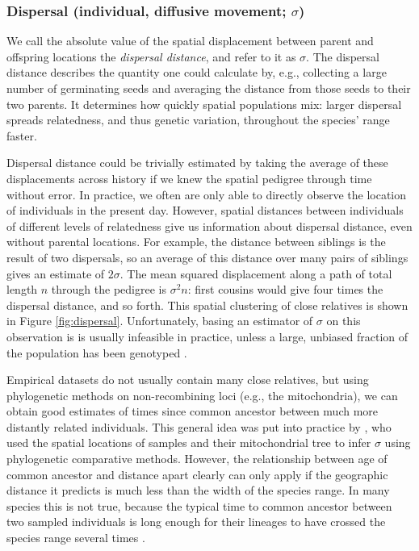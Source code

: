 \documentclass{ar-1col}
\renewcommand{\emph}[1]{{\textit{#1}}}
\begin{document}
\subsubsection{Dispersal (individual, diffusive movement; $\sigma$)}

We call the absolute value of the spatial displacement between parent and offspring locations
the \emph{dispersal distance}, and refer to it as $\sigma$.
The dispersal distance describes the quantity one could calculate by,
e.g., collecting a large number of germinating seeds
and averaging the distance from those seeds to their two parents.
It determines how quickly spatial populations mix:
larger dispersal spreads relatedness, and thus genetic variation,
throughout the species' range faster.

Dispersal distance could be trivially estimated by taking
the average of these displacements across history
if we knew the spatial pedigree through time without error.
In practice, we often are only able to directly observe
the location of individuals in the present day.
However, 
spatial distances between individuals of different levels of relatedness
give us information about dispersal distance, even without parental locations.
For example,
the distance between siblings is the result of two dispersals,
so an average of this distance over many pairs of siblings 
gives an estimate of $2 \sigma$.
The mean squared displacement along
a path of total length $n$ through the pedigree is $\sigma^2 n$:
first cousins would give four times the dispersal distance, and so forth.
This spatial clustering of close relatives
is shown in Figure \ref{fig:dispersal}.
Unfortunately, basing an estimator of $\sigma$ on this observation
is is usually infeasible in practice,
unless a large, unbiased fraction of the population has been genotyped
\citep[e.g.,][]{Aguillon2017deconstructing}.

Empirical datasets do not usually contain many close relatives,
but using phylogenetic methods on non-recombining loci (e.g., the mitochondria),
we can obtain good estimates of times since common ancestor
between much more distantly related individuals.
This general idea was put into practice by \citet{neigel1993application}, %
who used the spatial locations of samples and their mitochondrial tree 
to infer $\sigma$ using phylogenetic comparative methods.
However, the relationship between age of common ancestor and distance apart
clearly can only apply if the geographic distance it predicts 
is much less than the width of the species range.
In many species this is not true,
because the typical time to common ancestor between two sampled individuals is long enough 
for their lineages to have crossed the species range several times \citep{barton1995genealogies}.
\end{document}
